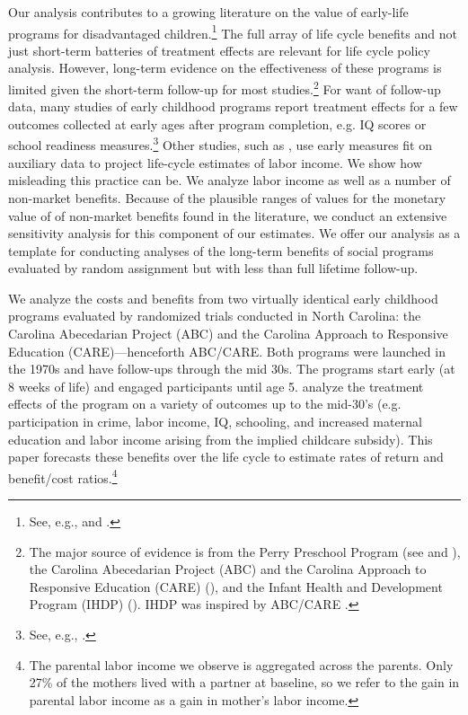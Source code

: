 Our analysis contributes to a growing literature on the value of early-life programs for disadvantaged children.\footnote{See, e.g., \cite{Currie_2011_AER} and \cite{Elango_Hojman_etal_2016_Early-Edu}.} The full array of life cycle benefits and not just short-term batteries of treatment effects are relevant for life cycle policy analysis. However, long-term evidence on the effectiveness of these programs is limited given the short-term follow-up for most studies.\footnote{The major source of evidence is from the Perry Preschool Program (see \citealp{Schweinhart_Montie_ea_2005_BOOKlifetime} and \citealp{Heckman_Moon_etal_2010_QE,Heckman_Moon_etal_2010_RateofReturn}), the Carolina Abecedarian Project (ABC) and the Carolina Approach to Responsive Education (CARE) (\citealp{Ramey_Campbell_etal_2000_ADS,Ramey-etal_2012-ABC}), and the Infant Health and Development Program (IHDP) (\citealp{Gross_Spiker_etal_1997_BOOKHelpinglowbirth,Duncan_Sojourner_2013_JHR}). IHDP was inspired by ABC/CARE \citep[][]{Gross_Spiker_etal_1997_BOOKHelpinglowbirth}.} For want of follow-up data, many studies of early childhood programs report treatment effects for a few outcomes collected at early ages after program completion, e.g. IQ scores or school readiness measures.\footnote{See, e.g.,  \cite{Weiland_2013_CD_Impacts-of-Pre-K}.} Other studies, such as \citet{Kline_Walters_2016_QJE}, use early measures fit on auxiliary data to project life-cycle estimates of labor income. We show how misleading this practice can be. We analyze labor income as well as a number of non-market benefits. Because of the plausible ranges of values for the monetary value of of non-market benefits found in the literature, we conduct an extensive sensitivity analysis for this component of our estimates. We offer our analysis as a template for conducting analyses of the long-term benefits of social programs evaluated by random assignment but with less than full lifetime follow-up.

We analyze the costs and benefits from two virtually identical early childhood programs evaluated by randomized trials conducted in North Carolina: the Carolina Abecedarian Project (ABC) and the Carolina Approach to Responsive Education (CARE)---henceforth ABC/CARE. Both programs were launched in the 1970s and have follow-ups through the mid 30s. The programs start early (at 8 weeks of life) and engaged participants until age 5. \cite{Garcia_Heckman_Ziff_2017_Gender-Diff_UNPUBLISHED} analyze the treatment effects of the program on a variety of outcomes up to the mid-30's (e.g. participation in crime, labor income, IQ, schooling, and increased maternal education and labor income arising from the implied childcare subsidy). This paper forecasts these benefits over the life cycle to estimate rates of return and benefit/cost ratios.\footnote{The parental labor income we observe is aggregated across the parents. Only 27\% of the mothers lived with a partner at baseline, so we refer to the gain in parental labor income as a gain in mother's labor income.}

